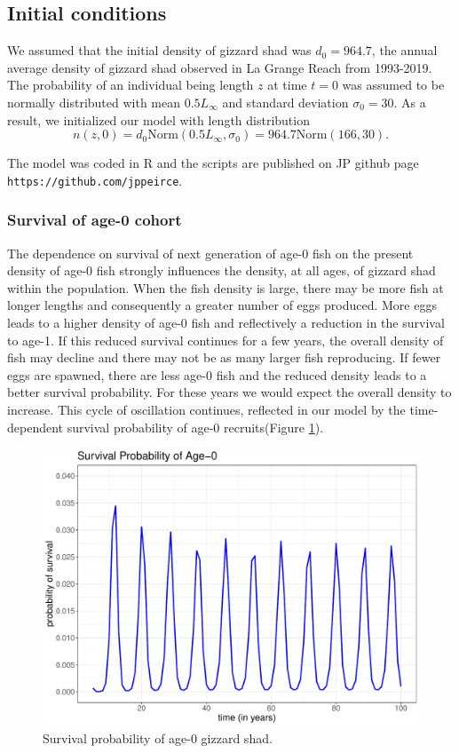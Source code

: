 \documentclass[preprint,review,12pt,authoryear]{elsarticle}
\begin{document}
\subsection{Initial conditions}  We assumed that the initial density of gizzard shad was $d_0 = 964.7$, the annual average density of gizzard shad observed in La Grange Reach from 1993-2019.  
The probability of an individual being length $z$ at time $t=0$  was assumed to be normally distributed with mean $0.5L_\infty$ and standard deviation $\sigma_0 = 30$.  
As a result, we initialized our model with length distribution
\begin{equation}\label{eq:n}
 n(z,0) = d_0 \mbox{Norm} (0.5 L_\infty, \sigma_0) = 964.7 \mbox{Norm} (166, 30). 
 \end{equation}

The model was coded in R \citep{R} and the scripts are published on JP github page \verb+https://github.com/jppeirce+.

\subsubsection{Survival of age-0 cohort} \label{sec:survival}
The dependence on survival of next generation of age-0 fish on the present density of age-0 fish strongly influences the density, at all ages, of gizzard shad within the population. 
When the fish density is large, there may be more fish at longer lengths and consequently a greater number of eggs produced.  
More eggs leads to a higher density of age-0 fish and reflectively a reduction in the survival to age-1.  
If this reduced survival continues for a few years, the overall density of fish may decline and there may not be as many larger fish reproducing.  
If fewer eggs are spawned, there are less age-0 fish and the reduced density leads to a better survival probability.  
For these years we would expect the overall density to increase.  
This cycle of oscillation continues, reflected in our model by the time-dependent survival probability of age-0 recruits(Figure \ref{fig:age0time}).

\begin{figure}
\centering
  \includegraphics[width=.4\textwidth]{figures/Figure2a.pdf}
   \caption{}
  \label{fig:age0time}
\caption{Survival probability of age-0 gizzard shad.}
\end{figure}    
\end{document}
